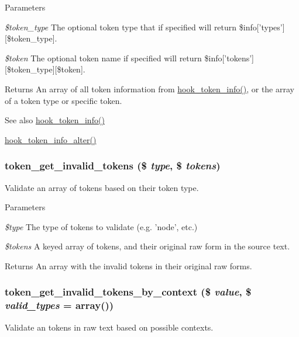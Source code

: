 \begin{DoxyParams}{Parameters}
\item[{\em \$token\_\-type}]The optional token type that if specified will return \$info\mbox{[}'types'\mbox{]}\mbox{[}\$token\_\-type\mbox{]}. \item[{\em \$token}]The optional token name if specified will return \$info\mbox{[}'tokens'\mbox{]}\mbox{[}\$token\_\-type\mbox{]}\mbox{[}\$token\mbox{]}.\end{DoxyParams}
\begin{DoxyReturn}{Returns}
An array of all token information from \hyperlink{group__hooks_gab868597197cf36911f95dcd29ae0b954}{hook\_\-token\_\-info()}, or the array of a token type or specific token.
\end{DoxyReturn}
\begin{DoxySeeAlso}{See also}
\hyperlink{group__hooks_gab868597197cf36911f95dcd29ae0b954}{hook\_\-token\_\-info()} 

\hyperlink{group__hooks_ga87392434688c9f52c4066de4ab9d73a8}{hook\_\-token\_\-info\_\-alter()} 
\end{DoxySeeAlso}
\hypertarget{token_8module_a1b020d15d269cf5fa17cb7861d105687}{
\subsubsection[{token\_\-get\_\-invalid\_\-tokens}]{\setlength{\rightskip}{0pt plus 5cm}token\_\-get\_\-invalid\_\-tokens (\$ {\em type}, \/  \$ {\em tokens})}}
\label{token_8module_a1b020d15d269cf5fa17cb7861d105687}
Validate an array of tokens based on their token type.


\begin{DoxyParams}{Parameters}
\item[{\em \$type}]The type of tokens to validate (e.g. 'node', etc.) \item[{\em \$tokens}]A keyed array of tokens, and their original raw form in the source text. \end{DoxyParams}
\begin{DoxyReturn}{Returns}
An array with the invalid tokens in their original raw forms. 
\end{DoxyReturn}
\hypertarget{token_8module_a8a2c76f5c0318bb7834f89c4a32e11f0}{
\subsubsection[{token\_\-get\_\-invalid\_\-tokens\_\-by\_\-context}]{\setlength{\rightskip}{0pt plus 5cm}token\_\-get\_\-invalid\_\-tokens\_\-by\_\-context (\$ {\em value}, \/  \$ {\em valid\_\-types} = {\ttfamily array()})}}
\label{token_8module_a8a2c76f5c0318bb7834f89c4a32e11f0}
Validate an tokens in raw text based on possible contexts.


